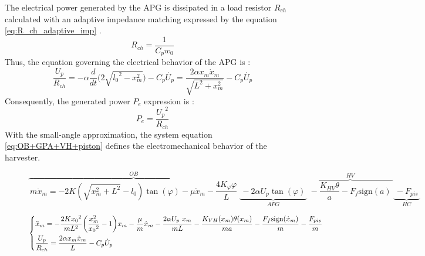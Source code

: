 \documentclass[3p,twocolumn,preprint]{elsarticle}
\begin{document}
The electrical power generated by the APG is dissipated in a load resistor $R_{ch}$ calculated with an adaptive impedance matching expressed by the equation \ref{eq:R_ch_adaptive_imp} \cite{Liu2013}. 
\begin{equation}
	R_{ch} = \dfrac{1}{C_p w_0}
	\label{eq:R_ch_adaptive_imp}
\end{equation}
Thus, the equation governing the electrical behavior of the APG is :
\begin{equation}
	\dfrac{U_p}{R_{ch}} = 
	-\alpha\dfrac{d}{dt}\biggl(2\sqrt{{l_0}^2-x_m^2}\biggr)
	- C_p\dot{U_p}
	= \frac{2\alpha x_m\dot{x}_m}{\sqrt{L^2+x_m^2}} - C_p\dot{U_p}
\end{equation}
Consequently, the generated power $P_e$ expression is :
\begin{equation}
	P_e = \frac{{U_p}^2}{R_{ch}} 
	\label{eq:P_e}
\end{equation} 
With the small-angle approximation, the system equation \ref{eq:OB+GPA+VH+piston} defines the electromechanical behavior of the harvester. 
\begin{figure}
\begin{equation}
\overbrace{\ m \ddot{x}_m =-2K(\sqrt{x_m^2+L^2}-l_0)\tan(\varphi) 
							-\mu \dot{x}_m
							-\frac{4K_{\varphi}\varphi}{L}\ }^{OB}
			\underbrace{\ -2\alpha U_p \tan(\varphi)\ }_{APG}		 
			\overbrace{\ -\dfrac{K_{HV}\theta}{a} - F_f\text{sign}(a)\ }^{HV}
			\underbrace{\ -F_{pis}\ }_{HC}
\label{eq:OB-GPA}
\end{equation}
\end{figure}
\begin{figure}
\begin{equation}
	\begin{dcases}
\ddot{x}_m = - \frac{2K{x_0}^2}{mL^2}\biggl(\frac{x_m^2}{{x_0}^2} -1\biggr)
			   x_m - \frac{\mu}{m}\dot{x}_m - \frac{2\alpha U_p\ x_m}{mL}
			-\frac{K_{VH}(x_m)\theta(x_m)}{ma}
			-\frac{F_f\text{sign}(\dot{x}_m)}{m}
			-\frac{F_{pis}}{m} \\
\dfrac{U_p}{R_{ch}} = \frac{2\alpha x_m \dot{x}_m}{L} - C_p\dot{U}_p
	\end{dcases}
	\label{eq:OB+GPA+VH+piston}	
\end{equation}
\end{figure}
\end{document}
